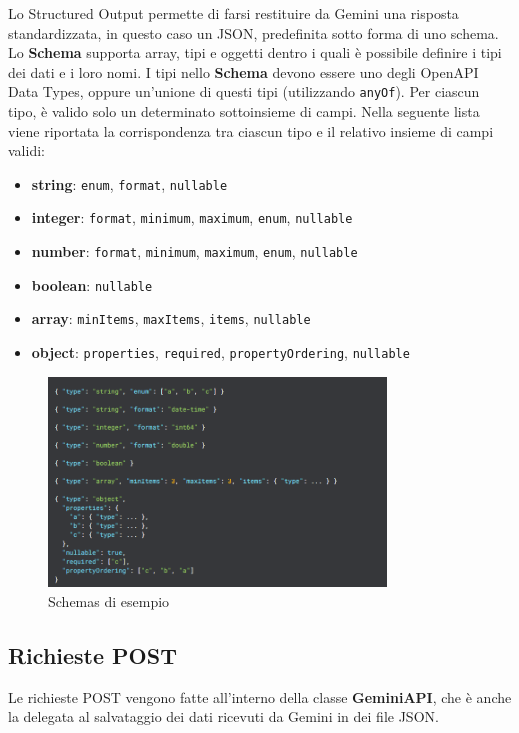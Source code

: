 Lo Structured Output permette di farsi restituire da Gemini una risposta standardizzata, in questo caso un JSON, predefinita sotto forma di uno schema. Lo \textbf{Schema} supporta array, tipi e oggetti dentro i quali è possibile definire i tipi dei dati e i loro nomi. \cite{StructuredOutput}
I tipi nello \textbf{Schema} devono essere uno degli OpenAPI Data Types, oppure un'unione di questi tipi (utilizzando \texttt{anyOf}). Per ciascun tipo, è valido solo un determinato sottoinsieme di campi. Nella seguente lista viene riportata la corrispondenza tra ciascun tipo e il relativo insieme di campi validi:
\begin{itemize}
    \item \textbf{string}: \texttt{enum}, \texttt{format}, \texttt{nullable}
    \item \textbf{integer}: \texttt{format}, \texttt{minimum}, \texttt{maximum}, \texttt{enum}, \texttt{nullable}
    \item \textbf{number}: \texttt{format}, \texttt{minimum}, \texttt{maximum}, \texttt{enum}, \texttt{nullable}
    \item \textbf{boolean}: \texttt{nullable}
    \item \textbf{array}: \texttt{minItems}, \texttt{maxItems}, \texttt{items}, \texttt{nullable}
    \item \textbf{object}: \texttt{properties}, \texttt{required}, \texttt{propertyOrdering}, \texttt{nullable}
\end{itemize}

\begin{figure}[H]
    \centering
    \includegraphics[width=0.8\textwidth,height=\textheight,keepaspectratio]{figures/chapter_1/GeminiSchema.png}
    \caption{Schemas di esempio}
\end{figure}

\subsection{Richieste POST}
Le richieste POST vengono fatte all'interno della classe \textbf{GeminiAPI}, che è anche la delegata al salvataggio dei dati ricevuti da Gemini in dei file JSON.

